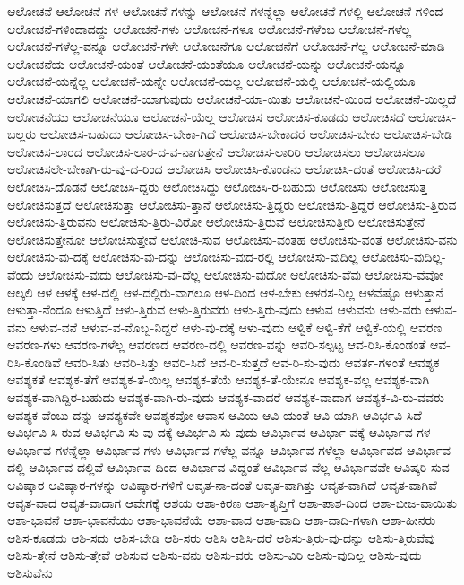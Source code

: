 {ಆಲೋಚನೆ
ಆಲೋಚನೆ-ಗಳ
ಆಲೋಚನೆ-ಗಳನ್ನು
ಆಲೋಚನೆ-ಗಳನ್ನೆಲ್ಲಾ
ಆಲೋಚನೆ-ಗಳಲ್ಲಿ
ಆಲೋಚನೆ-ಗಳಿಂದ
ಆಲೋಚನೆ-ಗಳಿಂದಾದದ್ದು
ಆಲೋಚನೆ-ಗಳು
ಆಲೋಚನೆ-ಗಳೂ
ಆಲೋಚನೆ-ಗಳೆಂಬ
ಆಲೋಚನೆ-ಗಳೆಲ್ಲ
ಆಲೋಚನೆ-ಗಳೆಲ್ಲ-ವನ್ನೂ
ಆಲೋಚನೆ-ಗಳೇ
ಆಲೋಚನೆಗೂ
ಆಲೋಚನೆಗೆ
ಆಲೋಚನೆ-ಗೆಲ್ಲ
ಆಲೋಚನೆ-ಮಾಡಿ
ಆಲೋಚನೆಯ
ಆಲೋಚನೆ-ಯಂತೆ
ಆಲೋಚನೆ-ಯಂತೆಯೂ
ಆಲೋಚನೆ-ಯನ್ನು
ಆಲೋಚನೆ-ಯನ್ನೂ
ಆಲೋಚನೆ-ಯನ್ನೆಲ್ಲ
ಆಲೋಚನೆ-ಯನ್ನೇ
ಆಲೋಚನೆ-ಯಲ್ಲ
ಆಲೋಚನೆ-ಯಲ್ಲಿ
ಆಲೋಚನೆ-ಯಲ್ಲಿಯೂ
ಆಲೋಚನೆ-ಯಾಗಲಿ
ಆಲೋಚನೆ-ಯಾಗುವುದು
ಆಲೋಚನೆ-ಯಾ-ಯಿತು
ಆಲೋಚನೆ-ಯಿಂದ
ಆಲೋಚನೆ-ಯಿಲ್ಲದೆ
ಆಲೋಚನೆಯು
ಆಲೋಚನೆಯೂ
ಆಲೋಚನೆ-ಯೆಲ್ಲ
ಆಲೋಚಿಸ
ಆಲೋಚಿಸ-ಕೂಡದು
ಆಲೋಚಿಸದೆ
ಆಲೋಚಿಸ-ಬಲ್ಲರು
ಆಲೋಚಿಸ-ಬಹುದು
ಆಲೋಚಿಸ-ಬೇಕಾ-ಗಿದೆ
ಆಲೋಚಿಸ-ಬೇಕಾದರೆ
ಆಲೋಚಿಸ-ಬೇಕು
ಆಲೋಚಿಸ-ಬೇಡಿ
ಆಲೋಚಿಸ-ಲಾರದ
ಆಲೋಚಿಸ-ಲಾರ-ದ-ವ-ನಾಗುತ್ತೇನೆ
ಆಲೋಚಿಸ-ಲಾರಿರಿ
ಆಲೋಚಿಸಲು
ಆಲೋಚಿಸಲೂ
ಆಲೋಚಿಸಲೇ-ಬೇಕಾಗಿ-ರು-ವು-ದ-ರಿಂದ
ಆಲೋಚಿಸಿ
ಆಲೋಚಿಸಿ-ಕೊಂಡನು
ಆಲೋಚಿಸಿ-ದಂತೆ
ಆಲೋಚಿಸಿ-ದರೆ
ಆಲೋಚಿಸಿ-ದೊಡನೆ
ಆಲೋಚಿಸಿ-ದ್ದರು
ಆಲೋಚಿಸಿದ್ದು
ಆಲೋಚಿಸಿ-ರ-ಬಹುದು
ಆಲೋಚಿಸು
ಆಲೋಚಿಸುತ್ತ
ಆಲೋಚಿಸುತ್ತದೆ
ಆಲೋಚಿಸುತ್ತಾ
ಆಲೋಚಿಸು-ತ್ತಾನೆ
ಆಲೋಚಿಸು-ತ್ತಿದ್ದರು
ಆಲೋಚಿಸು-ತ್ತಿದ್ದರೆ
ಆಲೋಚಿಸು-ತ್ತಿರುವ
ಆಲೋಚಿಸು-ತ್ತಿರುವನು
ಆಲೋಚಿಸು-ತ್ತಿರು-ವಿರೋ
ಆಲೋಚಿಸು-ತ್ತಿರುವೆ
ಆಲೋಚಿಸುತ್ತೀರಿ
ಆಲೋಚಿಸುತ್ತೇನೆ
ಆಲೋಚಿಸುತ್ತೇನೋ
ಆಲೋಚಿಸುತ್ತೇವೆ
ಆಲೋಚಿ-ಸುವ
ಆಲೋಚಿಸು-ವಂತಹ
ಆಲೋಚಿಸು-ವಂತೆ
ಆಲೋಚಿಸು-ವನು
ಆಲೋಚಿಸು-ವು-ದಕ್ಕೆ
ಆಲೋಚಿಸು-ವು-ದನ್ನು
ಆಲೋಚಿಸು-ವುದ-ರಲ್ಲಿ
ಆಲೋಚಿಸು-ವುದಿಲ್ಲ
ಆಲೋಚಿಸು-ವುದಿಲ್ಲ-ವೆಂದು
ಆಲೋಚಿಸು-ವುದು
ಆಲೋಚಿಸು-ವು-ದೆಲ್ಲ
ಆಲೋಚಿಸು-ವುದೋ
ಆಲೋಚಿಸು-ವೆವು
ಆಲೋಚಿಸು-ವೆವೋ
ಆಲ್ಕಲಿ
ಆಳ
ಆಳಕ್ಕೆ
ಆಳ-ದಲ್ಲಿ
ಆಳ-ದಲ್ಲಿರು-ವಾಗಲೂ
ಆಳ-ದಿಂದ
ಆಳ-ಬೇಕು
ಆಳರಸ-ನಿಲ್ಲ
ಆಳವೆಷ್ಟೊ
ಆಳುತ್ತಾನೆ
ಆಳುತ್ತಾ-ನೆಂದೂ
ಆಳುತ್ತಿದೆ
ಆಳು-ತ್ತಿರುವ
ಆಳು-ತ್ತಿರುವರು
ಆಳು-ತ್ತಿರು-ವುದು
ಆಳುವ
ಆಳುವನು
ಆಳು-ವರು
ಆಳುವ-ವನು
ಆಳುವ-ವನೆ
ಆಳುವ-ವ-ನೊಬ್ಬ-ನಿದ್ದರೆ
ಆಳು-ವು-ದಕ್ಕೆ
ಆಳು-ವುದು
ಆಳ್ವಿಕೆ
ಆಳ್ವಿ-ಕೆಗೆ
ಆಳ್ವಿಕೆ-ಯಲ್ಲಿ
ಆವರಣ
ಆವರಣ-ಗಳು
ಆವರಣ-ಗಳೆಲ್ಲ
ಆವರಣದ
ಆವರಣ-ದಲ್ಲಿ
ಆವರಣ-ವನ್ನು
ಆವರಿ-ಸಲ್ಪಟ್ಟ
ಆವ-ರಿಸಿ-ಕೊಂಡಂತೆ
ಆವ-ರಿಸಿ-ಕೊಂಡಿವೆ
ಆವರಿ-ಸಿತು
ಆವರಿ-ಸಿತ್ತು
ಆವರಿ-ಸಿದೆ
ಆವ-ರಿ-ಸುತ್ತದೆ
ಆವ-ರಿ-ಸು-ವುದು
ಆವರ್ತ-ಗಳಂತೆ
ಆವಶ್ಯಕ
ಆವಶ್ಯಕತೆ
ಆವಶ್ಯಕ-ತೆಗೆ
ಆವಶ್ಯಕ-ತೆ-ಯಿಲ್ಲ
ಆವಶ್ಯಕ-ತೆಯೆ
ಆವಶ್ಯಕ-ತೆ-ಯೇನೂ
ಆವಶ್ಯಕ-ವಲ್ಲ
ಆವಶ್ಯಕ-ವಾಗಿ
ಆವಶ್ಯಕ-ವಾಗಿದ್ದಿರ-ಬಹುದು
ಆವಶ್ಯಕ-ವಾಗಿ-ರು-ವುದು
ಆವಶ್ಯಕ-ವಾದರೆ
ಆವಶ್ಯಕ-ವಾದಾಗ
ಆವಶ್ಯಕ-ವಿ-ರು-ವವರು
ಆವಶ್ಯಕ-ವೆಂಬು-ದನ್ನು
ಆವಶ್ಯಕವೇ
ಆವಶ್ಯಕವೋ
ಆವಾಸ
ಆವಿಯ
ಆವಿ-ಯಂತೆ
ಆವಿ-ಯಾಗಿ
ಆವಿರ್ಭವಿ-ಸಿದೆ
ಆವಿರ್ಭವಿ-ಸಿ-ರುವ
ಆವಿರ್ಭವಿ-ಸು-ವು-ದಕ್ಕೆ
ಆವಿರ್ಭವಿ-ಸು-ವುದು
ಆವಿರ್ಭಾವ
ಆವಿರ್ಭಾ-ವಕ್ಕೆ
ಆವಿರ್ಭಾವ-ಗಳ
ಆವಿರ್ಭಾವ-ಗಳನ್ನೆಲ್ಲಾ
ಆವಿರ್ಭಾವ-ಗಳು
ಆವಿರ್ಭಾವ-ಗಳೆಲ್ಲ-ವನ್ನೂ
ಆವಿರ್ಭಾವ-ಗಳೆಲ್ಲಾ
ಆವಿರ್ಭಾವದ
ಆವಿರ್ಭಾವ-ದಲ್ಲಿ
ಆವಿರ್ಭಾವ-ದಲ್ಲಿವೆ
ಆವಿರ್ಭಾವ-ದಿಂದ
ಆವಿರ್ಭಾವ-ವಿದ್ದಂತೆ
ಆವಿರ್ಭಾವ-ವೆಲ್ಲ
ಆವಿರ್ಭಾವವೇ
ಆವಿಷ್ಕರಿ-ಸುವ
ಆವಿಷ್ಕಾರ
ಆವಿಷ್ಕಾರ-ಗಳನ್ನು
ಆವಿಷ್ಕಾರ-ಗಳಿಗೆ
ಆವೃತ-ನಾ-ದಂತೆ
ಆವೃತ-ವಾಗಿತ್ತು
ಆವೃತ-ವಾಗಿದೆ
ಆವೃತ-ವಾಗಿವೆ
ಆವೃತ-ವಾದ
ಆವೃತ-ವಾದಾಗ
ಆವೇಗಕ್ಕೆ
ಆಶಯ
ಆಶಾ-ಕಿರಣ
ಆಶಾ-ತೃಪ್ತಿಗೆ
ಆಶಾ-ಪಾಶ-ದಿಂದ
ಆಶಾ-ಬೀಜ-ವಾಯಿತು
ಆಶಾ-ಭಾವನೆ
ಆಶಾ-ಭಾವನೆಯು
ಆಶಾ-ಭಾವನೆಯೆ
ಆಶಾ-ವಾದ
ಆಶಾ-ವಾದಿ
ಆಶಾ-ವಾದಿ-ಗಳಾಗಿ
ಆಶಾ-ಹೀನರು
ಆಶಿಸ-ಕೂಡದು
ಆಶಿ-ಸದು
ಆಶಿಸ-ಬೇಡಿ
ಆಶಿ-ಸರು
ಆಶಿಸಿ
ಆಶಿಸಿ-ದರೆ
ಆಶಿಸು-ತ್ತಿರು-ವು-ದನ್ನು
ಆಶಿಸು-ತ್ತಿರುವೆವು
ಆಶಿಸು-ತ್ತೇನೆ
ಆಶಿಸು-ತ್ತೇವೆ
ಆಶಿಸುವ
ಆಶಿಸು-ವನು
ಆಶಿಸು-ವರು
ಆಶಿಸು-ವಿರಿ
ಆಶಿಸು-ವುದಿಲ್ಲ
ಆಶಿಸು-ವುದು
ಆಶಿಸುವೆನು
}
